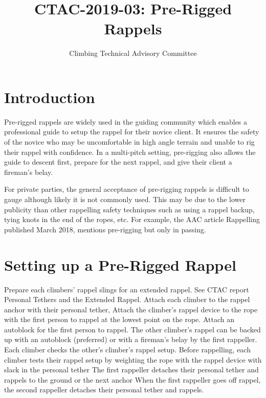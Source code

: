 \documentclass[nonacm,acmtog,authordraft]{acmart}
\title{CTAC-2019-03: Pre-Rigged Rappels}
\subtitle{Climbing Technical Advisory Committee}
\begin{document}
\maketitle

\section{Introduction}

  Pre-rigged rappels are widely used in the guiding community which enables a
  professional guide to setup the rappel for their novice client.  It ensures
  the safety of the novice who may be uncomfortable in high angle terrain and
  unable to rig their rappel with confidence.  In a multi-pitch setting,
  pre-rigging also allows the guide to descent first, prepare for the next
  rappel, and give their client a fireman's belay.

  For private parties, the general acceptance of pre-rigging rappels is
  difficult to gauge although likely it is not commonly used.  This may be due
  to the lower publicity than other rappelling safety techniques such as using
  a rappel backup, tying knots in the end of the ropes, etc.  For example, the
  AAC article Rappelling published March 2018, mentions pre-rigging but only in
  passing.

\section{Setting up a Pre-Rigged Rappel}

  Prepare each climbers' rappel slings for an extended rappel.  See CTAC report
  Personal Tethers and the Extended Rappel.  Attach each climber to the rappel
  anchor with their personal tether, Attach the climber's rappel device to the
  rope with the first person to rappel at the lowest point on the rope.  Attach
  an autoblock for the first person to rappel.  The other climber's rappel can
  be backed up with an autoblock (preferred) or with a fireman's belay by the
  first rappeller.  Each climber checks the other's climber's rappel setup.
  Before rappelling, each climber tests their rappel setup by weighting the
  rope with the rappel device with slack in the personal tether The first
  rappeller detaches their personal tether and rappels to the ground or the
  next anchor When the first rappeller goes off rappel, the second rappeller
  detaches their personal tether and rappels.
\end{document}
